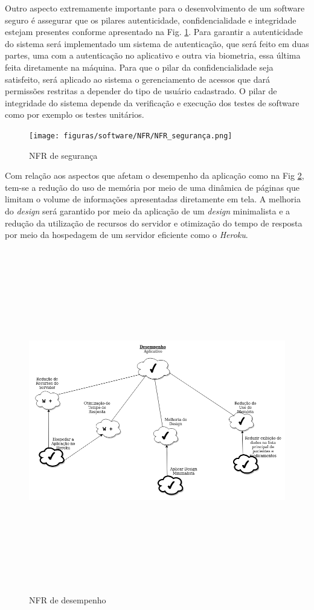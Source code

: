 Outro aspecto extremamente importante para o desenvolvimento de um software seguro é assegurar que os pilares autenticidade, confidencialidade e integridade estejam presentes conforme apresentado na Fig. \ref{fig:nfr-seguranca}. Para garantir a autenticidade do sistema será implementado um sistema de autenticação, que será feito em duas partes, uma com a autenticação no aplicativo e outra via biometria, essa última feita diretamente na máquina. Para que o pilar da confidencialidade seja satisfeito, será aplicado ao sistema o gerenciamento de acessos que dará permissões restritas a depender do tipo de usuário cadastrado. O pilar de integridade do sistema depende da verificação e execução dos testes de software como por exemplo os testes unitários.

\begin{figure}[H]
    \centering
    \texttt{[image: figuras/software/NFR/NFR\_segurança.png]}
    \caption{NFR de segurança}
    \label{fig:nfr-seguranca}
\end{figure}

Com relação aos aspectos que afetam o desempenho da aplicação como na Fig \ref{fig:nfr-desempenho}, tem-se a redução do uso de memória por meio de uma dinâmica de páginas que limitam o volume de informações apresentadas diretamente em tela. A melhoria do \emph{design} será garantido por meio da aplicação de um \emph{design} minimalista e a redução da utilização de recursos do servidor e otimização do tempo de resposta por meio da hospedagem de um servidor eficiente como o \textit{Heroku}.

\begin{figure}[H]
    \centering
    \includegraphics[width=15cm, height=15cm, keepaspectratio]{figuras/software/NFR/NFR_desempenho.png}
    \caption{NFR de desempenho}
    \label{fig:nfr-desempenho}
\end{figure}

